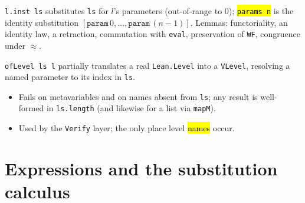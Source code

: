 \begin{definition}
\label{def:vlevel-inst}
\leanok
{}

 \texttt{l.inst ls} substitutes \texttt{ls} for $l$'s parameters
(out-of-range to $0$); \hl{\texttt{params n}} is the identity substitution
$[\texttt{param}\,0,\dots,\texttt{param}\,(n-1)]$.
Lemmas: functoriality, an identity law, a retraction, commutation with
\texttt{eval}, preservation of \texttt{WF}, congruence under $\approx$.
\end{definition}

\begin{definition}
\label{def:vlevel-oflevel}
\leanok
{}

 \texttt{ofLevel ls l} partially translates a real \texttt{Lean.Level} into
a \texttt{VLevel}, resolving a named parameter to its index in \texttt{ls}.
\begin{itemize}
\item Fails on metavariables and on names absent from \texttt{ls}; any result is
well-formed in \texttt{ls.length} (and likewise for a list via \texttt{mapM}).
\item Used by the \texttt{Verify} layer; the only place level \hl{names} occur.
\end{itemize}
\end{definition}

\section{Expressions and the substitution calculus}

